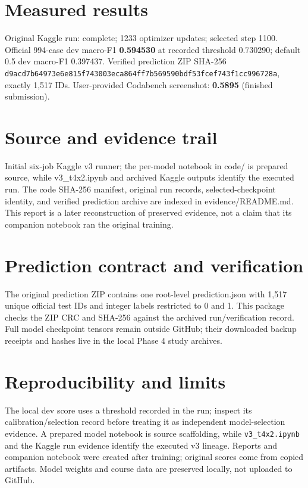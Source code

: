 \documentclass[11pt,a4paper]{article}
\begin{document}
\section{Measured results}
Original Kaggle run: complete; 1233 optimizer updates; selected step 1100. Official 994-case dev macro-F1 \textbf{0.594530} at recorded threshold 0.730290; default 0.5 dev macro-F1 0.397437. Verified prediction ZIP SHA-256 \texttt{d9acd7b64973e6e815f743003eca864ff7b569590bdf53fcef743f1cc996728a}, exactly 1,517 IDs. User-provided Codabench screenshot: \textbf{0.5895} (finished submission).
\section{Source and evidence trail}
Initial six-job Kaggle v3 runner; the per-model notebook in code/ is prepared source, while v3\_t4x2.ipynb and archived Kaggle outputs identify the executed run. The code SHA-256 manifest, original run records, selected-checkpoint identity, and verified prediction archive are indexed in evidence/README.md. This report is a later reconstruction of preserved evidence, not a claim that its companion notebook ran the original training.
\section{Prediction contract and verification}
The original prediction ZIP contains one root-level prediction.json with 1,517 unique official test IDs and integer labels restricted to 0 and 1. This package checks the ZIP CRC and SHA-256 against the archived run/verification record. Full model checkpoint tensors remain outside GitHub; their downloaded backup receipts and hashes live in the local Phase 4 study archives.
\section{Reproducibility and limits}
The local dev score uses a threshold recorded in the run; inspect its calibration/selection record before treating it as independent model-selection evidence. A prepared model notebook is source scaffolding, while \texttt{v3\_t4x2.ipynb} and the Kaggle run evidence identify the executed v3 lineage. Reports and companion notebook were created after training; original scores come from copied artifacts. Model weights and course data are preserved locally, not uploaded to GitHub.
\end{document}

